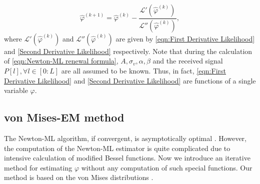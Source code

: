 \documentclass[12pt,draftclsnofoot,journal,onecolumn]{IEEEtran}
\theoremstyle{nonumberplain}
\begin{document}
    \begin{equation}
        \hat{\varphi}^{(k+1)} = \hat{\varphi}^{(k)} - \frac{\mathcal{L}'(\hat{\varphi}^{(k)})}{\mathcal{L}''(\hat{\varphi}^{(k)})},
        \label{eqn:Newton-ML renewal formula}
    \end{equation}
    where $\mathcal{L}'(\hat{\varphi}^{(k)})$ and $\mathcal{L}''(\hat{\varphi}^{(k)})$ are given by \eqref{eqn:First Derivative Likelihood} and \eqref{Second Derivative Likelihood} respectively. Note that during the calculation of \eqref{eqn:Newton-ML renewal formula}, $A, \sigma_v, \alpha, \beta$ and the received signal $P[l], \forall l\in [0:L]$ are all assumed to be known. Thus, in fact,  \eqref{eqn:First Derivative Likelihood} and \eqref{Second Derivative Likelihood} are functions of a single variable $\varphi$. 

\subsection{von Mises-EM method}    \label{von Mises-EM method}
    The Newton-ML algorithm, if convergent, is asymptotically optimal \cite{casella2021statistical}. 
    However, the computation of the Newton-ML estimator is quite complicated due to intensive calculation of modified Bessel functions. 
    Now we introduce an iterative method for estimating $\varphi$ without any computation of such special functions.
    Our method is based on the von Mises distributions \cite{gatto2007generalized}.
\end{document}
